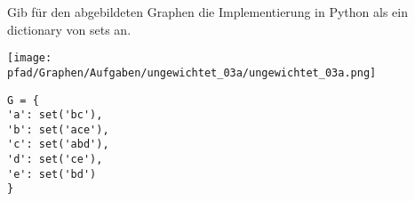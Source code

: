 ﻿\question[3]
Gib für den abgebildeten Graphen die Implementierung in Python als
ein dictionary von sets an.

\texttt{[image: \\pfad/Graphen/Aufgaben/ungewichtet\_03a/ungewichtet\_03a.png]}
\begin{solutionbox}{4cm}
\begin{lstlisting}
G = {
'a': set('bc'),
'b': set('ace'),
'c': set('abd'),
'd': set('ce'),
'e': set('bd')
}
\end{lstlisting}
\end{solutionbox}
